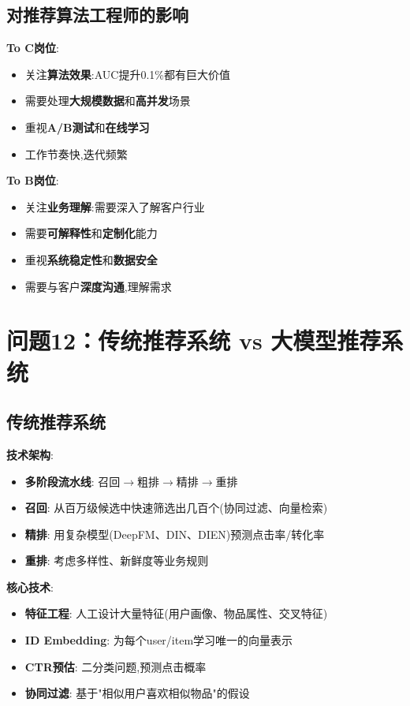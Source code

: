\documentclass[UTF8]{ctexart}
\begin{document}
\subsection{对推荐算法工程师的影响}

\textbf{To C岗位}:
\begin{itemize}
    \item 关注\textbf{算法效果}:AUC提升0.1\%都有巨大价值
    \item 需要处理\textbf{大规模数据}和\textbf{高并发}场景
    \item 重视\textbf{A/B测试}和\textbf{在线学习}
    \item 工作节奏快,迭代频繁
\end{itemize}

\textbf{To B岗位}:
\begin{itemize}
    \item 关注\textbf{业务理解}:需要深入了解客户行业
    \item 需要\textbf{可解释性}和\textbf{定制化}能力
    \item 重视\textbf{系统稳定性}和\textbf{数据安全}
    \item 需要与客户\textbf{深度沟通},理解需求
\end{itemize}

\section{问题12：传统推荐系统 vs 大模型推荐系统}

\subsection{传统推荐系统}

\textbf{技术架构}:
\begin{itemize}
    \item \textbf{多阶段流水线}: 召回$\rightarrow$粗排$\rightarrow$精排$\rightarrow$重排
    \item \textbf{召回}: 从百万级候选中快速筛选出几百个(协同过滤、向量检索)
    \item \textbf{精排}: 用复杂模型(DeepFM、DIN、DIEN)预测点击率/转化率
    \item \textbf{重排}: 考虑多样性、新鲜度等业务规则
\end{itemize}

\textbf{核心技术}:
\begin{itemize}
    \item \textbf{特征工程}: 人工设计大量特征(用户画像、物品属性、交叉特征)
    \item \textbf{ID Embedding}: 为每个user/item学习唯一的向量表示
    \item \textbf{CTR预估}: 二分类问题,预测点击概率
    \item \textbf{协同过滤}: 基于"相似用户喜欢相似物品"的假设
\end{itemize}
\end{document}
